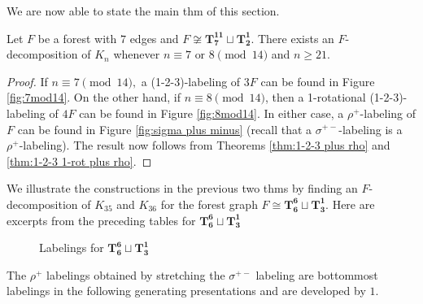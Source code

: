 We are now able to state the main thm of this section.
\begin{thm}\label{thm:7 or 8 mod 14}
    Let $F$ be a forest with $7$ edges and $F \not \cong \mathbf{T_{7}^{11}}\sqcup\mathbf{T_{2}^{1}}$. There exists an $F$-decomposition of $K_n$ whenever $n \equiv 7 \textrm{ or } 8 \pmod{14}$ and $n \geq 21.$
\end{thm}
\begin{proof}
    If $n \equiv 7 \pmod{14},$ a (1-2-3)-labeling of $3F$ can be found in Figure \ref{fig:7mod14}. On the other hand, if $n \equiv 8 \pmod{14}$, then a 1-rotational (1-2-3)-labeling of $4F$ can be found in Figure \ref{fig:8mod14}. In either case, a $\rho^{+}$-labeling of $F$ can be found in Figure \ref{fig:sigma plus minus} (recall that a $\sigma^{+-}$-labeling is a $\rho^{+}$-labeling). The result now follows from Theorems \ref{thm:1-2-3 plus rho} and \ref{thm:1-2-3 1-rot plus rho}.
\end{proof}
\begin{example}
We illustrate the constructions in the previous two thms by finding an $F$-decomposition of $K_{35}$ and $K_{36}$ for the forest graph $F \cong \mathbf{T_{6}^{6}} \sqcup \mathbf{T_{3}^{1}}$. 
\newpage
\noindent Here are excerpts from the preceding tables for $\mathbf{T_{6}^{6}} \sqcup \mathbf{T_{3}^{1}}$

\begin{figure}[H]
\centering
        \scalebox{0.4}{}
        \caption{Labelings for $\mathbf{T_{6}^{6}} \sqcup \mathbf{T_{3}^{1}}$}
        \label{fig:example chart}
\end{figure}

The $\rho^{+}$ labelings obtained by stretching the $\sigma^{+-}$ labeling are bottommost labelings in the following generating presentations and are developed by $1$.
\end{example}

        
        
